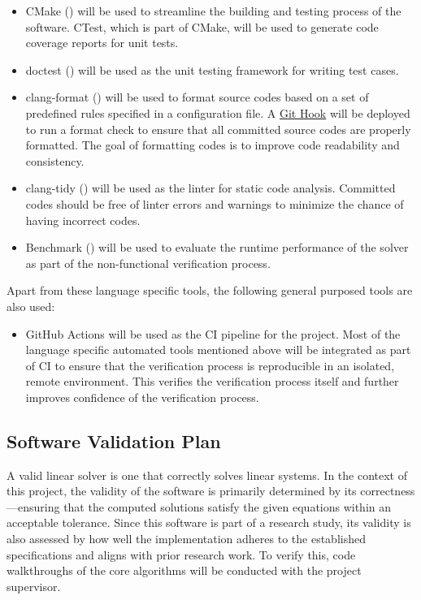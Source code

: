 \documentclass[12pt, titlepage]{article}
\begin{document}
\begin{itemize}
\item CMake (\cite{noauthor_cmake_nodate}) will be used to streamline the building and
  testing process of the software. CTest, which is part of CMake, will be used
  to generate code coverage reports for unit tests.
\item doctest (\cite{noauthor_doctestdoctest_2025}) will be used as the unit testing
  framework for writing test cases.
\item clang-format (\cite{noauthor_clangformat_nodate}) will be used to format source
  codes based on a set of predefined rules specified in a configuration file. A
  \href{https://git-scm.com/book/ms/v2/Customizing-Git-Git-Hooks}{Git Hook} will
  be deployed to run a format check to ensure that all committed source codes
  are properly formatted. The goal of formatting codes is to improve code
  readability and consistency.
\item clang-tidy (\cite{noauthor_clang-tidy_nodate}) will be used as the linter for
  static code analysis. Committed codes should be free of linter errors and
  warnings to minimize the chance of having incorrect codes.
\item Benchmark (\cite{noauthor_googlebenchmark_2025}) will be used to evaluate the
  runtime performance of the solver as part of the non-functional verification
  process.
\end{itemize}

Apart from these language specific tools, the following general purposed tools
are also used:

\begin{itemize}
\item GitHub Actions will be used as the CI pipeline for the project. Most of the
  language specific automated tools mentioned above will be integrated as part
  of CI to ensure that the verification process is reproducible in an isolated,
  remote environment. This verifies the verification process itself and further
  improves confidence of the verification process.
\end{itemize}

\subsection{Software Validation Plan}

A valid linear solver is one that correctly solves linear systems. In the
context of this project, the validity of the software is primarily determined by
its correctness---ensuring that the computed solutions satisfy the given
equations within an acceptable tolerance. Since this software is part of a
research study, its validity is also assessed by how well the implementation
adheres to the established specifications and aligns with prior research work.
To verify this, code walkthroughs of the core algorithms will be conducted with
the project supervisor.
\end{document}
